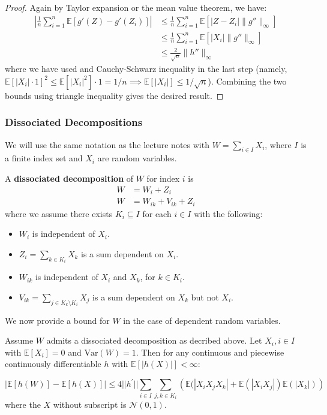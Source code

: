 \documentclass{article}
\begin{document}
\begin{proof}
    Again by Taylor expansion or the mean value theorem, we have:
    \begin{align*}
        \left|\frac{1}{n} \sum_{i=1}^{n} \mathbb{E}[g'(Z) -g'(Z_i)]\right| &\leq \frac{1}{n} \sum_{i=1}^{n} \mathbb{E}[|Z-Z_i| \|g''\|_\infty]\\ 
        &\leq \frac{1}{n} \sum_{i=1}^{n} \mathbb{E}[|X_i| \|g''\|_\infty] \\
        &\leq \frac{2}{\sqrt{n}} \|h''\|_\infty
    \end{align*}
    where we have used  and Cauchy-Schwarz inequality in the last step (namely, $\mathbb{E}[|X_i| \cdot 1]^2 \leq \mathbb{E}[|X_i|^2] \cdot 1=1/n \implies \mathbb{E}[|X_i|]\leq 1/\sqrt{n}$). Combining the two bounds using triangle inequality gives the desired result.
\end{proof}


\subsubsection{Dissociated Decompositions}
We will use the same notation as the lecture notes with $W=\sum_{i\in I} X_i$, where $I$ is a finite index set and $X_i$ are random variables.

\begin{definition}\label{def:dissociated_decomposition}
    A \textbf{dissociated decomposition} of $W$ for index $i$ is 
    \begin{align*}
        W &= W_i + Z_i \\
        W &= W_{ik} + V_{ik} + Z_i
    \end{align*}
    where we assume there exists $K_i\subseteq I$ for each $i\in I$ with the following:
    \begin{itemize}
        \item $W_i$ is independent of $X_i$.
        \item $Z_i=\sum_{k\in K_i} X_k$ is a sum dependent on $X_i$.
        \item $W_{ik}$ is independent of $X_i$ and $X_k$, for $k\in K_i$.
        \item $V_{ik}=\sum_{j \in K_k\setminus K_i} X_j$ is a sum dependent on $X_k$ but not $X_i$.
    \end{itemize}
\end{definition}

We now provide a bound for $W$ in the case of dependent random variables.

\begin{theorem}
    Assume $W$ admits a dissociated decomposition as decribed above. Let $X_i, i\in I$ with $\mathbb{E}[X_i]=0$ and $\mathrm{Var}(W)=1$. Then for any continuous and piecewise continuously differentiable $h$ with $\mathbb{E}[|h(X)|]<\infty$:

    \begin{equation*}
        \left|\mathbb{E}[h(W)] - \mathbb{E}[h(X)]\right| \leq 4||h^{\prime}||\sum_{i\in I}\sum_{j,k\in K_{i}}\left(\mathbb{E}(|X_{i}X_{j}X_{k}|+\mathbb{E}(|X_{i}X_{j}|)\mathbb{E}(|X_{k}|)\right)
    \end{equation*}
    where the $X$ without subscript is $\mathcal{N}(0,1)$.  
\end{theorem}
\end{document}
